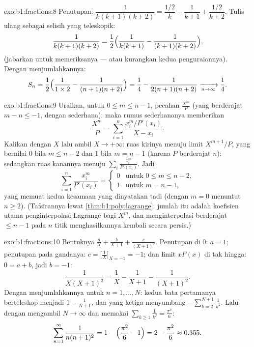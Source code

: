 \begin{solution}{exo:b1:fractions:8}
Penutupan: $\dfrac{1}{k(k+1)(k+2)} = \dfrac{1/2}{k} - \dfrac{1}{k+1} +
\dfrac{1/2}{k+2}$. Tulis ulang sebagai selisih yang teleskopik:
\[
\frac{1}{k(k+1)(k+2)}
= \frac12\Bigl(\frac{1}{k(k+1)} - \frac{1}{(k+1)(k+2)}\Bigr),
\]
(jabarkan untuk memeriksanya --- atau kurangkan kedua penguraiannya). Dengan menjumlahkannya:
\[
S_n = \frac12\Bigl(\frac{1}{1 \times 2} - \frac{1}{(n+1)(n+2)}\Bigr)
= \frac14 - \frac{1}{2(n+1)(n+2)}
\xrightarrow[n \to \infty]{} \frac14 .
\]
\end{solution}

\begin{solution}{exo:b1:fractions:9}
Uraikan, untuk $0 \leq m \leq n - 1$, pecahan $\frac{X^m}{P}$
(yang berderajat $m - n \leq -1$, dengan  sederhana): maka rumus  sederhananya memberikan
\[
\frac{X^m}{P} = \sum_{i=1}^{n} \frac{x_i^m / P'(x_i)}{X - x_i} .
\]
Kalikan dengan $X$ lalu ambil $X \to +\infty$: ruas kirinya menuju
limit $X^{m+1}/P$, yang bernilai $0$ bila $m \leq n - 2$ dan $1$ bila $m =
n - 1$ (karena $P$  berderajat $n$); sedangkan ruas kanannya menuju
$\sum_i \frac{x_i^m}{P'(x_i)}$. Jadi
\[
\sum_{i=1}^{n} \frac{x_i^{m}}{P'(x_i)} =
\begin{cases}
0 & \text{untuk } 0 \leq m \leq n-2,\\
1 & \text{untuk } m = n - 1,
\end{cases}
\]
yang memuat kedua kesamaan yang dinyatakan tadi (dengan $m = 0$ menuntut $n \geq
2$). (Tafsirannya lewat \cref{thm:b1:poly:lagrange}: jumlah itu adalah
koefisien utama penginterpolasi Lagrange bagi $X^m$, dan
menginterpolasi  berderajat $\leq n-1$ pada $n$ titik
menghasilkannya kembali secara persis.)
\end{solution}

\begin{solution}{exo:b1:fractions:10}
Bentuknya $\frac aX + \frac b{X+1} + \frac c{(X+1)^2}$. Penutupan di
$0$: $a = 1$; penutupan pada  gandanya: $c = \bigl[\frac1X
\bigr]_{X=-1} = -1$; dan limit $xF(x)$ di tak hingga: $0 = a + b$, jadi
$b = -1$:
\[
\frac{1}{X(X+1)^2} = \frac1X - \frac1{X+1} - \frac1{(X+1)^2} .
\]
Dengan menjumlahkannya untuk $n = 1, \dots, N$: kedua bata pertamanya berteleskop menjadi
$1 - \frac1{N+1}$, dan yang ketiga menyumbang $-\sum_{k=2}^{N+1}
\frac1{k^2}$. Lalu dengan mengambil $N \to \infty$ dan memakai $\sum_{k\geq1}
\frac1{k^2} = \frac{\pi^2}6$:
\[
\sum_{n=1}^{\infty}\frac{1}{n(n+1)^2}
= 1 - \Bigl(\frac{\pi^2}6 - 1\Bigr) = 2 - \frac{\pi^2}6
\approx 0.355 .
\]
\end{solution}


